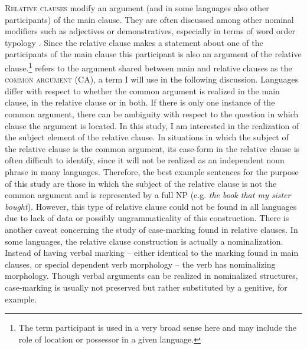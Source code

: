 \textsc{Relative clauses} modify an argument (and in some languages also other participants) of the main clause. 
They are often discussed among other nominal modifiers such as adjectives or demonstratives, especially in terms of word order typology \citep[cf.][]{WALS90}. 
Since the relative clause makes a statement about one of the participants of the main clause this participant is also an argument of the relative clause.\footnote{The term participant is used in a very broad sense here and may include the role of location or possessor in a given language.}
\citet[314]{Dixon:2010-2} refers to the argument shared between main and relative clauses as the \textsc{common argument} (CA), a term I will use in the following discussion. 
Languages differ with respect to whether the common argument is realized in the main clause, in the relative clause or in both. 
If there is only one instance of the common argument, there can be ambiguity with respect to the question in which clause the argument is located.
In this study, I am interested in the realization of the subject element of the relative clause. 
In situations in which the subject of the relative clause is the common argument, its case-form in the relative clause is often difficult to identify, since it will not be realized as an independent noun phrase in many languages. 
Therefore, the best example sentences for the purpose of this study are those in which the subject of the relative clause is not the common argument and is represented by a full NP (e.g. \emph{the book that my sister bought}). 
However, this type of relative clause could not be found in all languages due to lack of data or possibly ungrammaticality of this construction.
There is another caveat concerning the study of case-marking found in relative clauses. 
In some languages, the relative clause construction is actually a nominalization. 
Instead of having verbal marking -- either identical to the marking found in main clauses, or special dependent verb morphology -- the verb has nominalizing morphology. 
Though verbal arguments can be realized in nominalized structures, case-marking is usually not preserved but rather substituted by a genitive, for example. 

